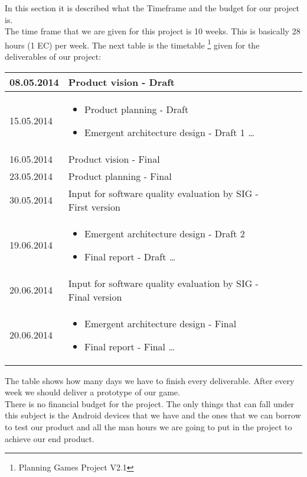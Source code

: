 In this section it is described what the Timeframe and the budget for our project is. \\
The time frame that we are given for this project is 10 weeks. This is basically 28 hours (1 EC) per week. 
The next table is the timetable \footnote{Planning Games Project V2.1} given for the deliverables of our project:
\begin{center}
	\begin{tabular}{ p{5cm} l | p{10cm}  l }
		\hline
	 	08.05.2014 & Product vision - Draft \\ \hline
		15.05.2014 & 
		\begin{itemize}
			\item Product planning - Draft
			\item Emergent architecture design - Draft 1 \ldots
		\end{itemize} \\ \hline
		16.05.2014 & Product vision - Final \\ \hline
		23.05.2014 & Product planning - Final \\ \hline
		30.05.2014 & Input for software quality evaluation by SIG - First version \\ \hline
		19.06.2014 &
		\begin{itemize}
			\item Emergent architecture design - Draft 2
			\item Final report - Draft \ldots
		\end{itemize} \\ \hline
		20.06.2014 & Input for software quality evaluation by SIG - Final version \\ \hline
		20.06.2014 &
		\begin{itemize}
			\item Emergent architecture design - Final
			\item Final report - Final \ldots
		\end{itemize} \\
		\hline
	\end{tabular}
\end{center}
The table shows how many days we have to finish every deliverable. After every week we should deliver a prototype of our game. \\
\newline
There is no financial budget for the project. The only things that can fall under this subject is the Android devices that we have and the ones that we can borrow to test our product and all the man hours we are going to put in the project to achieve our end product.